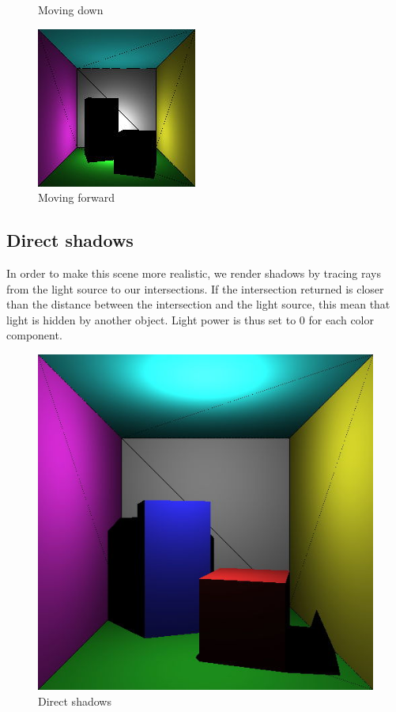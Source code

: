 \begin{figure}[H]
    \caption{Moving down}
\endminipage\hfill
{}
    \centering
    \includegraphics[width=\linewidth]{img/light_col3.jpg}
    \caption{Moving forward}
\endminipage\hfill
\end{figure}


\subsection{Direct shadows}
In order to make this scene more realistic, we render shadows by tracing rays from the light source to our intersections. If the intersection returned is closer than the distance between the intersection and the light source, this mean that light is hidden by another object. Light power is thus set to 0 for each color component.

\begin{figure}[H]
\centering
\includegraphics[width=0.35\linewidth]{img/shadows.jpg}
\caption{Direct shadows}
\end{figure}

